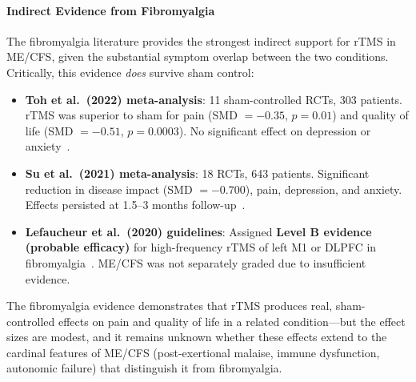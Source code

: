 \paragraph{Indirect Evidence from Fibromyalgia}

The fibromyalgia literature provides the strongest indirect support for rTMS in ME/CFS, given the substantial symptom overlap between the two conditions. Critically, this evidence \textit{does} survive sham control:

\begin{itemize}
    \item \textbf{Toh et al.\ (2022) meta-analysis}: 11 sham-controlled RCTs, 303 patients. rTMS was superior to sham for pain (SMD $= -0.35$, $p=0.01$) and quality of life (SMD $= -0.51$, $p=0.0003$). No significant effect on depression or anxiety~\cite{Toh2022fibrorTMS}.

    \item \textbf{Su et al.\ (2021) meta-analysis}: 18 RCTs, 643 patients. Significant reduction in disease impact (SMD $= -0.700$), pain, depression, and anxiety. Effects persisted at 1.5--3 months follow-up~\cite{Su2021fibrorTMS}.

    \item \textbf{Lefaucheur et al.\ (2020) guidelines}: Assigned \textbf{Level B evidence (probable efficacy)} for high-frequency rTMS of left M1 or DLPFC in fibromyalgia~\cite{Lefaucheur2020NIBS}. ME/CFS was not separately graded due to insufficient evidence.
\end{itemize}

The fibromyalgia evidence demonstrates that rTMS produces real, sham-controlled effects on pain and quality of life in a related condition---but the effect sizes are modest, and it remains unknown whether these effects extend to the cardinal features of ME/CFS (post-exertional malaise, immune dysfunction, autonomic failure) that distinguish it from fibromyalgia.

